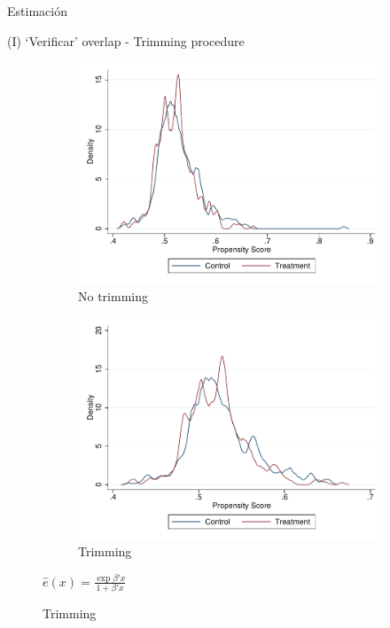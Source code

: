 \documentclass[8pt]{beamer}
\begin{document}
\begin{frame}[allowframebreaks]{Estimación}

(I) `Verificar' overlap - Trimming procedure\\
    
        \begin{figure}[H]
    \begin{center}
     \begin{subfigure}{0.4\textwidth}
    \caption*{No trimming}
            \centering
            \includegraphics[width=\textwidth]{Figuras/ps_overlap_before.pdf}
        \end{subfigure}
             \begin{subfigure}{0.4\textwidth}
    \caption*{Trimming}
            \centering
            \includegraphics[width=\textwidth]{Figuras/ps_overlap.pdf}
        \end{subfigure}
    \end{center}
     {\footnotesize {$\hat e(x)= \frac{\exp{\beta'x}}{1+\beta'x}$}} 
\end{figure}


\end{frame}
\end{document}
